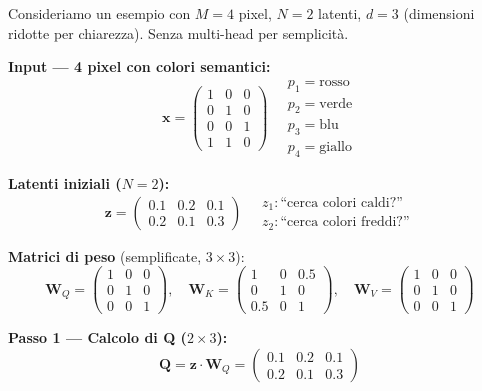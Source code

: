 \documentclass[12pt,a4paper]{article}
\begin{document}
\begin{examplebox}
Consideriamo un esempio con $M = 4$ pixel, $N = 2$ latenti, $d = 3$ (dimensioni ridotte per chiarezza). Senza multi-head per semplicit\`a.

\textbf{Input --- 4 pixel con colori semantici:}
\[
\mathbf{x} = \begin{pmatrix} 1 & 0 & 0 \\ 0 & 1 & 0 \\ 0 & 0 & 1 \\ 1 & 1 & 0 \end{pmatrix} \quad \begin{array}{l} p_1 = \text{rosso} \\ p_2 = \text{verde} \\ p_3 = \text{blu} \\ p_4 = \text{giallo} \end{array}
\]

\textbf{Latenti iniziali ($N = 2$):}
\[
\mathbf{z} = \begin{pmatrix} 0.1 & 0.2 & 0.1 \\ 0.2 & 0.1 & 0.3 \end{pmatrix} \quad \begin{array}{l} z_1: \text{``cerca colori caldi?''} \\ z_2: \text{``cerca colori freddi?''} \end{array}
\]

\textbf{Matrici di peso} (semplificate, $3 \times 3$):
\[
\mathbf{W}_Q = \begin{pmatrix} 1 & 0 & 0 \\ 0 & 1 & 0 \\ 0 & 0 & 1 \end{pmatrix}, \quad
\mathbf{W}_K = \begin{pmatrix} 1 & 0 & 0.5 \\ 0 & 1 & 0 \\ 0.5 & 0 & 1 \end{pmatrix}, \quad
\mathbf{W}_V = \begin{pmatrix} 1 & 0 & 0 \\ 0 & 1 & 0 \\ 0 & 0 & 1 \end{pmatrix}
\]

\textbf{Passo 1 --- Calcolo di Q ($2 \times 3$):}
\[
\mathbf{Q} = \mathbf{z} \cdot \mathbf{W}_Q = \begin{pmatrix} 0.1 & 0.2 & 0.1 \\ 0.2 & 0.1 & 0.3 \end{pmatrix}
\]


\end{examplebox}
\end{document}
